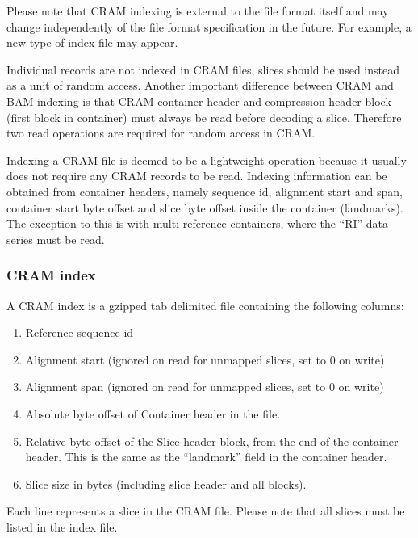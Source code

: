 \documentclass[a4paper]{article}
\begin{document}
Please note that CRAM indexing is external to the file format itself and may change 
independently of the file format specification in the future. For example, a new 
type of index file may appear.

Individual records are not indexed in CRAM files, slices should be used instead 
as a unit of random access. Another important difference between CRAM and BAM indexing 
is that CRAM container header and compression header block (first block in container) 
must always be read before decoding a slice. Therefore two read operations are 
required for random access in CRAM.

Indexing a CRAM file is deemed to be a lightweight operation because it usually does not require any CRAM records to be read.
Indexing information can be obtained from container headers, namely sequence id, alignment start and span, container start byte offset and slice byte offset inside the container (landmarks).
The exception to this is with multi-reference containers, where the ``RI'' data series must be read.

\subsubsection*{CRAM index}

A CRAM index is a gzipped tab delimited file containing the following columns:

\begin{enumerate}
\item Reference sequence id

\item Alignment start (ignored on read for unmapped slices, set to 0 on write)

\item Alignment span (ignored on read for unmapped slices, set to 0 on write)

\item Absolute byte offset of Container header in the file.

\item Relative byte offset of the Slice header block, from the end of
the container header.  This is the same as the ``landmark'' field
in the container header.

\item Slice size in bytes (including slice header and all blocks).
\end{enumerate}

Each line represents a slice in the CRAM file.
Please note that all slices must be listed in the index file.
\end{document}
